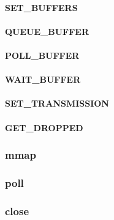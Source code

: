 \documentclass[12pt]{article}
\begin{document}
\paragraph{SET\_BUFFERS}

\paragraph{QUEUE\_BUFFER}

\paragraph{POLL\_BUFFER}

\paragraph{WAIT\_BUFFER}

\paragraph{SET\_TRANSMISSION}

\paragraph{GET\_DROPPED}

\subsubsection{mmap}

\subsubsection{poll}

\subsubsection{close}

\end{document}
